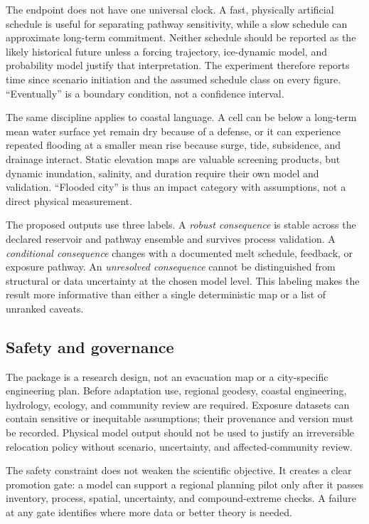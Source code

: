 \documentclass[conference]{IEEEtran}
\begin{document}
The endpoint does not have one universal clock. A fast, physically artificial schedule is useful for separating pathway sensitivity, while a slow schedule can approximate long-term commitment. Neither schedule should be reported as the likely historical future unless a forcing trajectory, ice-dynamic model, and probability model justify that interpretation. The experiment therefore reports time since scenario initiation and the assumed schedule class on every figure. “Eventually” is a boundary condition, not a confidence interval.

The same discipline applies to coastal language. A cell can be below a long-term mean water surface yet remain dry because of a defense, or it can experience repeated flooding at a smaller mean rise because surge, tide, subsidence, and drainage interact. Static elevation maps are valuable screening products, but dynamic inundation, salinity, and duration require their own model and validation. ``Flooded city'' is thus an impact category with assumptions, not a direct physical measurement.

The proposed outputs use three labels. A \textit{robust consequence} is stable across the declared reservoir and pathway ensemble and survives process validation. A \textit{conditional consequence} changes with a documented melt schedule, feedback, or exposure pathway. An \textit{unresolved consequence} cannot be distinguished from structural or data uncertainty at the chosen model level. This labeling makes the result more informative than either a single deterministic map or a list of unranked caveats.

\subsection{Safety and governance}

The package is a research design, not an evacuation map or a city-specific engineering plan. Before adaptation use, regional geodesy, coastal engineering, hydrology, ecology, and community review are required. Exposure datasets can contain sensitive or inequitable assumptions; their provenance and version must be recorded. Physical model output should not be used to justify an irreversible relocation policy without scenario, uncertainty, and affected-community review.

The safety constraint does not weaken the scientific objective. It creates a clear promotion gate: a model can support a regional planning pilot only after it passes inventory, process, spatial, uncertainty, and compound-extreme checks. A failure at any gate identifies where more data or better theory is needed.
\end{document}
